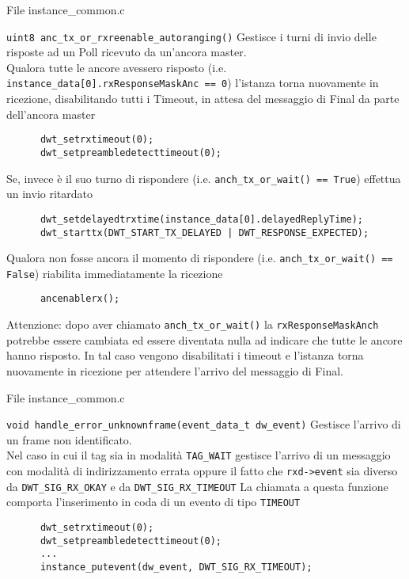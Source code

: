 \begin{frame}[fragile,shrink=30]{File instance\_common.c}
  \begin{block}{\lstinline!uint8 anc_tx_or_rxreenable_autoranging()!}
    Gestisce i turni di invio delle risposte ad un Poll ricevuto da un'ancora master.\\
    Qualora tutte le ancore avessero risposto (i.e. \lstinline!instance_data[0].rxResponseMaskAnc == 0!) l'istanza torna nuovamente in ricezione, disabilitando tutti i
    Timeout, in attesa del messaggio di Final da parte dell'ancora master 
    \begin{lstlisting}
      dwt_setrxtimeout(0);
      dwt_setpreambledetecttimeout(0);
    \end{lstlisting}
    Se, invece è il suo turno di rispondere (i.e. \lstinline!anch_tx_or_wait() == True!) effettua un invio ritardato
    \begin{lstlisting}
      dwt_setdelayedtrxtime(instance_data[0].delayedReplyTime);
      dwt_starttx(DWT_START_TX_DELAYED | DWT_RESPONSE_EXPECTED);
    \end{lstlisting}
    Qualora non fosse ancora il momento di rispondere (i.e. \lstinline!anch_tx_or_wait() == False!) riabilita immediatamente la ricezione
    \begin{lstlisting}
      ancenablerx();
    \end{lstlisting}    
    \textcolor{dgreen}{Attenzione:} dopo aver chiamato \lstinline!anch_tx_or_wait()! la \lstinline!rxResponseMaskAnch! potrebbe essere cambiata ed essere diventata
    nulla ad indicare che tutte le ancore hanno risposto. In tal caso vengono disabilitati i timeout e l'istanza torna nuovamente in ricezione per attendere l'arrivo del messaggio di Final.
  \end{block}
\end{frame}

\begin{frame}[fragile]{File instance\_common.c}
  \begin{block}{\lstinline!void handle_error_unknownframe(event_data_t dw_event)!}
    Gestisce l'arrivo di un frame non identificato.\\
    Nel caso in cui il tag sia in modalità \lstinline!TAG_WAIT! gestisce l'arrivo di un messaggio con modalità di indirizzamento
    errata oppure il fatto che \lstinline!rxd->event! sia diverso da \lstinline!DWT_SIG_RX_OKAY! e da \lstinline!DWT_SIG_RX_TIMEOUT!
    La chiamata a questa funzione comporta l'inserimento in coda di un evento di tipo \lstinline!TIMEOUT!
    \begin{lstlisting}
      dwt_setrxtimeout(0);
      dwt_setpreambledetecttimeout(0);
      ...
      instance_putevent(dw_event, DWT_SIG_RX_TIMEOUT);
    \end{lstlisting}
  \end{block}
\end{frame}

